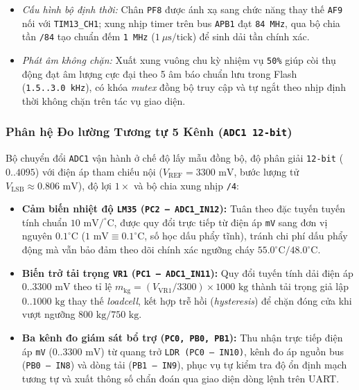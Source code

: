 \begin{itemize}[nosep]
    \begin{itemize}[nosep]
        \item \textit{Cấu hình bộ định thời:} Chân \texttt{PF8} được ánh xạ sang chức năng thay thế \texttt{AF9} nối với \texttt{TIM13\_CH1}; xung nhịp timer trên bus \texttt{APB1} đạt \texttt{84~MHz}, qua bộ chia tần \texttt{/84} tạo chuẩn đếm \texttt{1~MHz} ($1~\mu\text{s/tick}$) để sinh dải tần chính xác.
        \item \textit{Phát âm không chặn:} Xuất xung vuông chu kỳ nhiệm vụ \texttt{50\%} giúp còi thụ động đạt âm lượng cực đại theo 5 âm báo chuẩn lưu trong Flash (\texttt{1.5..3.0~kHz}), có khóa \textit{mutex} đồng bộ truy cập và tự ngắt theo nhịp định thời không chặn trên tác vụ giao diện.
    \end{itemize}
\end{itemize}

\subsubsection{Phân hệ Đo lường Tương tự 5 Kênh (\texttt{ADC1 12-bit})}
Bộ chuyển đổi \texttt{ADC1} vận hành ở chế độ lấy mẫu đồng bộ, độ phân giải \texttt{12-bit} ($0..4095$) với điện áp tham chiếu nội ($V_{\text{REF}} = 3300\text{ mV}$, bước lượng tử $V_{\text{LSB}} \approx 0.806\text{ mV}$), độ lợi $1\times$ và bộ chia xung nhịp \texttt{/4}:
\begin{itemize}[nosep]
    \item \textbf{Cảm biến nhiệt độ \texttt{LM35} (\texttt{PC2 -- ADC1\_IN12}):} Tuân theo đặc tuyến tuyến tính chuẩn $10\text{ mV}/^\circ\text{C}$, được quy đổi trực tiếp từ điện áp \texttt{mV} sang đơn vị nguyên $0.1^\circ\text{C}$ ($1\text{ mV} \equiv 0.1^\circ\text{C}$, số học dấu phẩy tĩnh), tránh chi phí dấu phẩy động mà vẫn bảo đảm theo dõi chính xác ngưỡng cháy $55.0^\circ\text{C}/48.0^\circ\text{C}$.
    \item \textbf{Biến trở tải trọng \texttt{VR1} (\texttt{PC1 -- ADC1\_IN11}):} Quy đổi tuyến tính dải điện áp $0..3300\text{ mV}$ theo tỉ lệ $m_{\text{kg}} = (V_{\text{VR1}} / 3300) \times 1000\text{ kg}$ thành tải trọng giả lập $0..1000\text{ kg}$ thay thế \textit{loadcell}, kết hợp trễ hồi (\textit{hysteresis}) để chặn đóng cửa khi vượt ngưỡng $800\text{ kg}/750\text{ kg}$.
    \item \textbf{Ba kênh đo giám sát bổ trợ (\texttt{PC0, PB0, PB1}):} Thu nhận trực tiếp điện áp \texttt{mV} ($0..3300\text{ mV}$) từ quang trở \texttt{LDR (PC0 -- IN10)}, kênh đo áp nguồn bus (\texttt{PB0 -- IN8}) và dòng tải (\texttt{PB1 -- IN9}), phục vụ tự kiểm tra độ ổn định mạch tương tự và xuất thông số chẩn đoán qua giao diện dòng lệnh trên UART.
\end{itemize}

